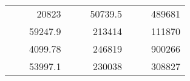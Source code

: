 \begin{table}[H]
\begin{tabular}{|ccrccrccc}
\rowcolor[HTML]{DDFDFF} 
\multicolumn{1}{|c|}{\cellcolor[HTML]{FFFFC7}}                                & \multicolumn{1}{c|}{\cellcolor[HTML]{DDFDFF}}                      & \multicolumn{1}{r|}{\cellcolor[HTML]{DAE8FC}20823}     & \multicolumn{1}{c|}{\cellcolor[HTML]{FFFFC7}}                                & \multicolumn{1}{c|}{\cellcolor[HTML]{DDFDFF}}                       & \multicolumn{1}{r|}{\cellcolor[HTML]{DDFDFF}50739.5}   & \multicolumn{1}{c|}{\cellcolor[HTML]{FFFFC7}}                                & \multicolumn{1}{c|}{\cellcolor[HTML]{DDFDFF}}                      & \multicolumn{1}{r|}{\cellcolor[HTML]{DDFDFF}489681}    \\ \cline{3-3} \cline{6-6} \cline{9-9} 
\multicolumn{1}{|c|}{\cellcolor[HTML]{FFFFC7}}                                & \multicolumn{1}{c|}{\cellcolor[HTML]{DDFDFF}}                      & \multicolumn{1}{r|}{\cellcolor[HTML]{DDFDFF}59247.9}   & \multicolumn{1}{c|}{\cellcolor[HTML]{FFFFC7}}                                & \multicolumn{1}{c|}{\cellcolor[HTML]{DDFDFF}}                       & \multicolumn{1}{r|}{\cellcolor[HTML]{DAE8FC}213414}    & \multicolumn{1}{c|}{\cellcolor[HTML]{FFFFC7}}                                & \multicolumn{1}{c|}{\cellcolor[HTML]{DDFDFF}}                      & \multicolumn{1}{r|}{\cellcolor[HTML]{DAE8FC}111870}    \\ \cline{3-3} \cline{6-6} \cline{9-9} 
\rowcolor[HTML]{DDFDFF} 
\multicolumn{1}{|c|}{\cellcolor[HTML]{FFFFC7}}                                & \multicolumn{1}{c|}{\cellcolor[HTML]{DDFDFF}}                      & \multicolumn{1}{r|}{\cellcolor[HTML]{DAE8FC}4099.78}   & \multicolumn{1}{c|}{\cellcolor[HTML]{FFFFC7}}                                & \multicolumn{1}{c|}{\cellcolor[HTML]{DDFDFF}}                       & \multicolumn{1}{r|}{\cellcolor[HTML]{DDFDFF}246819}    & \multicolumn{1}{c|}{\cellcolor[HTML]{FFFFC7}}                                & \multicolumn{1}{c|}{\cellcolor[HTML]{DDFDFF}}                      & \multicolumn{1}{r|}{\cellcolor[HTML]{DDFDFF}900266}    \\ \cline{3-3} \cline{6-6} \cline{9-9} 
\multicolumn{1}{|c|}{\cellcolor[HTML]{FFFFC7}}                                & \multicolumn{1}{c|}{\cellcolor[HTML]{DDFDFF}}                      & \multicolumn{1}{r|}{\cellcolor[HTML]{DDFDFF}53997.1}   & \multicolumn{1}{c|}{\cellcolor[HTML]{FFFFC7}}                                & \multicolumn{1}{c|}{\cellcolor[HTML]{DDFDFF}}                       & \multicolumn{1}{r|}{\cellcolor[HTML]{DAE8FC}230038}    & \multicolumn{1}{c|}{\cellcolor[HTML]{FFFFC7}}                                & \multicolumn{1}{c|}{\cellcolor[HTML]{DDFDFF}}                      & \multicolumn{1}{r|}{\cellcolor[HTML]{DAE8FC}308827}    \\ \cline{3-3} \cline{6-6} \cline{9-9} 

\end{tabular}
\end{table}
